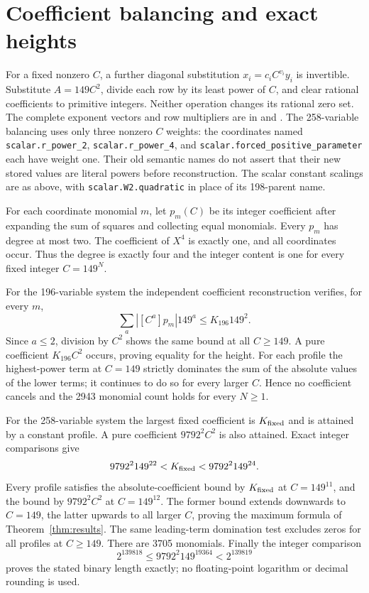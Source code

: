 \documentclass[11pt,a4paper]{article}
\begin{document}
\section{Coefficient balancing and exact heights}
For a fixed nonzero $C$, a further diagonal substitution
$x_i=c_i C^{v_i}y_i$ is invertible. Substitute $A=149C^2$, divide each
row by its least power of $C$, and clear rational coefficients to
primitive integers. Neither operation changes its rational zero set.
The complete exponent vectors and row multipliers are in
 and .
The 258-variable balancing uses only three nonzero $C$ weights: the
coordinates named \texttt{scalar.r\_power\_2},
\texttt{scalar.r\_power\_4}, and
\texttt{scalar.forced\_positive\_parameter} each have weight one.
Their old semantic names do not assert that their new stored values
are literal powers before reconstruction. The scalar constant scalings
are as above, with \texttt{scalar.W2.quadratic} in place of its
198-parent name.

For each coordinate monomial $m$, let $p_m(C)$ be its integer coefficient
after expanding the sum of squares and collecting equal monomials.
Every $p_m$ has degree at most two. The coefficient of $X^4$ is exactly
one, and all coordinates occur. Thus the degree is exactly four and
the integer content is one for every fixed integer $C=149^N$.

For the 196-variable system the independent coefficient reconstruction
verifies, for every $m$,
\[
 \sum_a |[C^a]p_m|149^a\le K_{196}149^2.
\]
Since $a\le2$, division by $C^2$ shows the same bound at all $C\ge149$.
A pure coefficient $K_{196}C^2$ occurs, proving equality for the height.
For each profile the highest-power term at $C=149$ strictly dominates
the sum of the absolute values of the lower terms; it continues to do
so for every larger $C$. Hence no coefficient cancels and the 2943
monomial count holds for every $N\ge1$.

For the 258-variable system the largest fixed coefficient is
$K_{\rm fixed}$ and is attained by a constant profile. A pure coefficient
$9792^2 C^2$ is also attained. Exact integer comparisons give
\[
 9792^2 149^{22}<K_{\rm fixed}<9792^2 149^{24}.
\]
Every profile satisfies the absolute-coefficient bound by $K_{\rm fixed}$
at $C=149^{11}$, and the bound by $9792^2C^2$ at $C=149^{12}$.
The former bound extends downwards to $C=149$, the latter upwards to
all larger $C$, proving the maximum formula of Theorem~\ref{thm:results}.
The same leading-term domination test excludes zeros for all profiles
at $C\ge149$. There are 3705 monomials. Finally the integer comparison
\[
 2^{139818}\le9792^2 149^{19364}<2^{139819}
\]
proves the stated binary length exactly; no floating-point logarithm
or decimal rounding is used.
\end{document}
